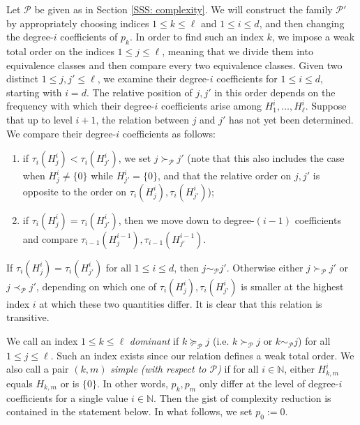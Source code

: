 \documentclass[11pt]{amsart}
\theoremstyle{definition}
\newcommand{\N}{{\mathbb N}}
\newcommand{\CP}{{\mathcal P}}
\newcommand{\1}{{\mathbf{1}}}
\begin{document}
Let $\CP$ be given as in Section \ref{SSS: complexity}. We will construct the family $\CP'$ by appropriately choosing indices $1\leq k\leq \ell$ and $1\leq i\leq d$, and then changing the degree-$i$ coefficients of $p_k$. 
In order to find such an index $k$, 
we impose a weak total order on the indices $1\leq j\leq \ell$, meaning that we divide them into equivalence classes and then compare every two equivalence classes. 
Given two distinct $1\leq j,j'\leq \ell$, we examine their degree-$i$ coefficients for $1\leq i\leq d$, starting with $i=d$. The relative position of $j,j'$ in this order depends on the frequency with which their degree-$i$ coefficients arise among $H_{1}^{i}, \ldots, H_{\ell}^{i}$. Suppose that up to level $i+1$, the relation between $j$ and $j'$ has not yet been determined. We compare their degree-$i$ coefficients as follows: 
\begin{enumerate}
    \item if $\tau_i(H_{j}^{i})<\tau_{i}(H_{j'}^{i})$, we set $j\succ_\CP j'$ (note that this also includes the case when ${H_{j}^{i}} \neq \{0\}$ while ${H_{j'}^{i}} = \{0\}$, and that the relative order on $j,j'$ is opposite to the order on $\tau_i(H_{j}^{i}),\tau_{i}(H_{j'}^{i})$);
    \item if  $\tau_i(H_{j}^{i})=\tau_{i}(H_{j'}^{i})$, then we move down to degree-$(i-1)$ coefficients and compare $\tau_{i-1}(H_{j}^{i-1}), \tau_{i-1}(H_{j'}^{i-1})$.
\end{enumerate}
If $\tau_i(H_{j}^{i}) = \tau_i(H_{j'}^{i})$ for all $1\leq i\leq d$, then $j\sim_\CP j'$. Otherwise either $j\succ_\CP j'$ or $j\prec_\CP j'$, depending on which one of $\tau_i(H_{j}^{i}),\tau_i(H_{j'}^{i})$ is smaller at the highest index $i$ at which these two quantities differ. It is clear that this relation is transitive.

We call an index $1\leq k\leq \ell$ \textit{dominant} if $k\succeq_\CP j$ (i.e. $k\succ_\CP j$ or $k\sim_\CP j$) for all $1\leq j\leq \ell.$ Such an index exists since our relation defines a weak total order. We also call a pair $(k,m)$ \emph{simple (with respect to $\CP$)} if for all $i\in\N$, either $H_{k,m}^{i}$ equals $H_{k,m}$ or is $\{0\}$. In other words, $p_k,p_m$ only differ at the level of degree-$i$ coefficients for a single value $i\in\N$.
Then the gist of complexity reduction is contained in the statement below. In what follows, we set $p_0 := 0$.
\end{document}
